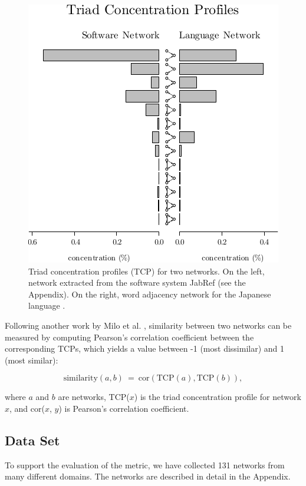 \begin{figure}[t]
\center
\includegraphics{tcp}
\caption{Triad concentration profiles (TCP) for two networks. On the left,
network extracted from the software system JabRef (see the Appendix). On the
right, word adjacency network for the Japanese language \cite{Milo2004}.}
\label{fig:profiles}
\end{figure}

Following another work by Milo et al. \cite{Milo2004}, similarity between two
networks can be measured by computing Pearson's correlation coefficient between
the corresponding TCPs, which yields a value between -1 (most dissimilar) and 1
(most similar):

$$
\mathrm{similarity}(a, b) ~=~ 
  \mathrm{cor}(\mathrm{TCP}(a), \mathrm{TCP}(b))\mathrm{,}
$$

where $a$ and $b$ are networks, TCP($x$) is the triad concentration profile for
network $x$, and cor($x$, $y$) is Pearson's correlation coefficient.

\subsection{Data Set}

To support the evaluation of the metric, we have collected 131 networks from
many different domains. The networks are described in detail in the Appendix.

